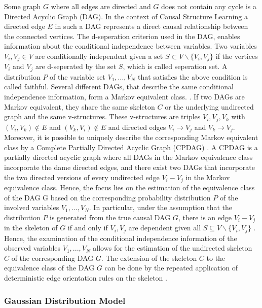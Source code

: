 Some graph $G$ where all edges are directed and $G$ does not contain any cycle is a Directed Acyclic Graph (DAG). In the context of Causal Structure Learning a directed edge $E$ in such a DAG represents a direct causal relationship between the connected vertices.
The d-seperation criterion used in the DAG, enables information about the conditional independence between variables. Two variables $V_i, V_j \in V$ are conditionally independent given a set $S \subset V \backslash \{V_i, V_j\}$ if the vertices $V_i$ and $V_j$ are d-seperated by the set $S$, which is called seperation set.
A distribution $P$ of the variable set $V_1, ..., V_N$ that satisfies the above condition is called faithful.
Several different DAGs, that describe the same conditional independence information, form a Markov equivalent class. \cite{andersson_characterization_1997}. If two DAGs are Markov equivalent, they share the same skeleton $C$ or the underlying undirected graph and the same v-structures.
These v-structures are triples $V_i,V_j,V_k$ with $(V_i,V_k) \notin E$ and $(V_k,V_i) \notin E$ and directed edges $V_i \rightarrow V_j$ and $V_k \rightarrow V_j$. Moreover, it is possible to uniquely describe the corresponding Markov equivalent class by a Complete Partially Directed Acyclic Graph (CPDAG) \cite{chickering_optimal_2003}.
A CPDAG is a partially directed acyclic graph where all DAGs in the Markov equivalence class incorporate the dame directed edges, and there exist two DAGs that incorporate the two directed versions of every undirected edge $V_i - V_j$ in the Markov equivalence class.
Hence, the focus lies on the estimation of the equivalence class of the DAG G based on the corresponding probability distribution $P$ of the involved variables $V_1,...,V_N$. In particular, under the assumption that the distribution $P$ is generated from the true causal DAG $G$, there is an edge $V_i - V_j$ in the skeleton of $G$ if and only if $V_i,V_j$ are dependent given all $S \subseteq V\backslash \{V_i,V_j\}$ \cite{spirtes_causation_1993}.
Hence, the examination of the conditional independence information of the observed variables $V_1,...,V_N$ allows for the estimation of the undirected skeleton $C$ of the corresponding DAG $G$. The extension of the skeleton $C$ to the equivalence class of the DAG $G$ can be done by the repeated application of deterministic edge orientation rules on the skeleton \cite{colombo_order-independent_nodate,kalisch_estimating_2007,pearl_introduction_2010}.

\subsubsection{Gaussian Distribution Model}


